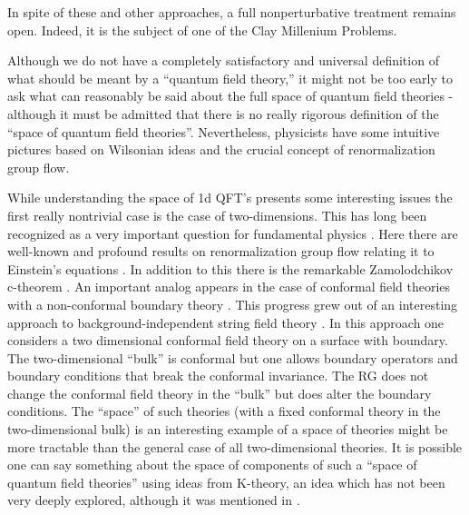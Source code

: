 \documentclass[12pt]{article}
\begin{document}
In spite of these and other approaches,   a full nonperturbative
treatment remains open. Indeed, it is the subject of one of the Clay Millenium
Problems.




Although we do not have a completely satisfactory and universal
definition of what should be meant by a ``quantum field theory,''
it might not be too early to ask what can reasonably be said about the full space
of quantum field theories - although it must be admitted that there is no
really rigorous definition of the ``space of quantum field theories''.
Nevertheless, physicists have some intuitive pictures based on Wilsonian
ideas and   the crucial concept of renormalization group flow.






While understanding the space of 1d QFT's presents some interesting
issues the first really nontrivial case is the case of two-dimensions.
This has long been recognized as a very important question for
fundamental physics \cite{Douglas:2010ic,Friedan:2002aa}. Here there are
well-known and profound results on renormalization group flow relating it
to Einstein's equations \cite{Callan:1985ia,Friedan:1980jm}. In addition
to this there is the remarkable Zamolodchikov c-theorem \cite{Zamolodchikov:1986gt}.
An important analog appears in the case of conformal field theories
with a non-conformal boundary theory \cite{Affleck:1991tk,Kutasov:2000qp,Friedan:2003yc}.
This progress grew out of an interesting approach to background-independent
string field theory \cite{Witten:1992qy,Gerasimov:2000zp,Kutasov:2000qp,Kutasov:2000aq}.
In this approach one considers 
a two dimensional conformal field theory on a surface with boundary. The two-dimensional ``bulk'' is 
conformal but one allows boundary operators and boundary conditions that break the conformal invariance.  
The RG does not change the conformal 
field theory in the ``bulk'' but does alter the boundary conditions. The ``space'' of 
such theories  (with a fixed conformal theory in the two-dimensional bulk)
is an interesting example of a space of theories might be more tractable than the general case of all two-dimensional theories. It is possible
one can say something about the space of components of such a ``space of
quantum field theories'' using ideas from K-theory, an idea which has
not been very deeply explored, although it was mentioned in \cite{Moore:2003vf}.
\end{document}

